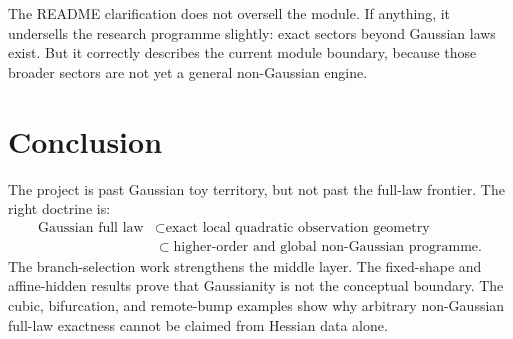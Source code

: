 \documentclass[11pt,a4paper]{article}
\numberwithin{equation}{section}
\theoremstyle{thmcompact}
\theoremstyle{remark}
\begin{document}
The README clarification does not oversell the module. If anything, it undersells the research programme slightly: exact sectors beyond Gaussian laws exist. But it correctly describes the current module boundary, because those broader sectors are not yet a general non-Gaussian engine.

\section{Conclusion}

The project is past Gaussian toy territory, but not past the full-law frontier. The right doctrine is:
\[
\begin{aligned}
\text{Gaussian full law}
&\subset
\text{exact local quadratic observation geometry}\\
&\subset
\text{higher-order and global non-Gaussian programme}.
\end{aligned}
\]
The branch-selection work strengthens the middle layer. The fixed-shape and affine-hidden results prove that Gaussianity is not the conceptual boundary. The cubic, bifurcation, and remote-bump examples show why arbitrary non-Gaussian full-law exactness cannot be claimed from Hessian data alone.
\end{document}
